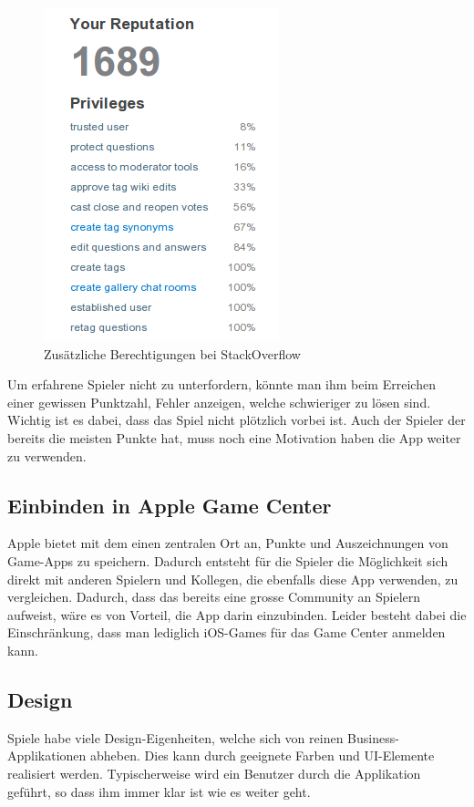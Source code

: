 \begin{figure}[H]
	\centering
	\includegraphics[scale=0.7]{images/gamification/so-privileges}
	\caption{Zusätzliche Berechtigungen bei StackOverflow}
	\label{gamification-so-privileges}
\end{figure}

Um erfahrene Spieler nicht zu unterfordern, könnte man ihm beim Erreichen einer gewissen Punktzahl, Fehler anzeigen, welche schwieriger zu lösen sind.
Wichtig ist es dabei, dass das Spiel nicht plötzlich vorbei ist.
Auch der Spieler der bereits die meisten Punkte hat, muss noch eine Motivation haben die App weiter zu verwenden.

\subsection{Einbinden in Apple Game Center}
Apple bietet mit dem  einen zentralen Ort an, Punkte und Auszeichnungen von Game-Apps zu speichern.
Dadurch entsteht für die Spieler die Möglichkeit sich direkt mit anderen Spielern und Kollegen, die ebenfalls diese App verwenden, zu vergleichen.
Dadurch, dass das  bereits eine grosse Community an Spielern aufweist, wäre es von Vorteil, die App darin einzubinden.
Leider besteht dabei die Einschränkung, dass man lediglich iOS-Games für das Game Center anmelden kann.

\subsection{Design}
Spiele habe viele Design-Eigenheiten, welche sich von reinen Business-Applikationen abheben.
Dies kann durch geeignete Farben und UI-Elemente realisiert werden.
Typischerweise wird ein Benutzer durch die Applikation geführt, so dass ihm immer klar ist wie es weiter geht.


